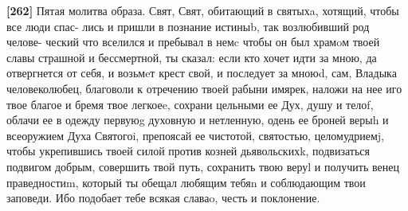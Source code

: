 \textbf{{[}262{]}} Пятая молитва образа.
Свят, Свят, обитающий в святыхa, хотящий, чтобы все люди спас- лись и пришли в познание истиныb, так возлюбивший род челове- ческий что вселился и пребывал в немc чтобы он был храмoм твоей славы страшной и бессмертной, ты сказал: если кто хочет идти за мною, да отвергнется от себя, и возьмeт крест свой, и последует за мноюd, сам, Владыка человеколюбец, благоволи к отречению твоей рабыни имярек, наложи на нее иго твое благое и бремя твое легкоеe, сохрани цельными ее Дух, душу и телоf, облачи ее в одежду первуюg духовную и нетленную, одень ее броней верыh и всеоружием Духа Святогоi, препоясай ее чистотой, святостью, целомудриемj, чтобы укрепившись твоей силой против козней дьявольскихk, подвизаться подвигом добрым, совершить твой путь, сохранить твою веруl и получить венец праведностиm, который ты обещал любящим тебяn и соблюдающим твои заповеди. Ибо подобает тебе всякая славаo, честь и поклонение.
